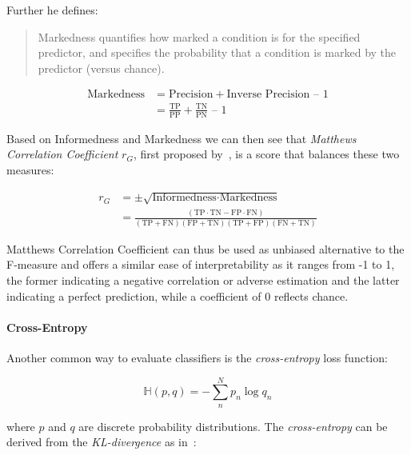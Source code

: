 Further he defines:
\blockquote{Markedness quantifies how marked a condition is for the specified predictor, and specifies the probability that a condition is marked by the predictor (versus chance).}

\begin{equation}
  \begin{split}
  \text{Markedness} &= \text{Precision} + \text{Inverse Precision} \text{ – } 1\\
  &=\frac{\text{TP}}{ \text{PP}} + \frac{\text{TN}}{\text{PN}} \text{ – } 1
  \end{split}
\end{equation}

Based on Informedness and Markedness we can then see that \emph{Matthews Correlation Coefficient} $r_{G}$, first proposed by~\cite{Matthews:1975aa}, is a score that balances these two measures:

\begin{equation}
  \begin{split}
  r_{G} &= \pm \sqrt{\text{Informedness} \cdot \text{Markedness}} \\
  &= \frac{(\text{TP} \cdot \text{TN} - \text{FP} \cdot \text{FN})}{(\text{TP} + \text{FN})(\text{FP} + \text{TN})(\text{TP} + \text{FP})(\text{FN} + \text{TN})}
\end{split}
\end{equation}

Matthews Correlation Coefficient can thus be used as unbiased alternative to the F-measure and offers a similar ease of interpretability as it ranges from -1 to 1, the former indicating a negative correlation or adverse estimation and the latter  indicating a perfect prediction, while a coefficient of 0 reflects chance.

\paragraph{Cross-Entropy}
\label{par:Cross-Entropy}

Another common way to evaluate classifiers is the \emph{cross-entropy} loss function:

\begin{equation}
  \mathbb{H}(p,q) = - \sum_n^N p_n \log q_n
\end{equation}

where $p$ and $q$ are discrete probability distributions. The \emph{cross-entropy} can be derived from the \emph{KL-divergence} as in~\cite[Chapter 2.8.2, p.~57]{Murphy:2012aa}:

